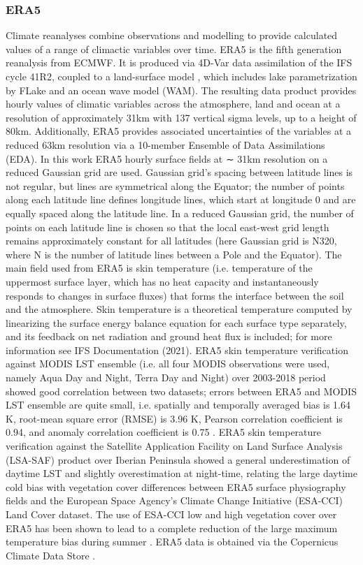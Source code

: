 \documentclass[hess, twostagejnl]{copernicus}
\begin{document}
\subsubsection{ERA5}
\noindent Climate reanalyses combine observations and modelling to provide calculated values of a range of climactic variables over time. ERA5 is the fifth generation reanalysis from ECMWF. It is produced via 4D-Var data assimilation of the IFS cycle 41R2, coupled to a land-surface model \citep[ECLand,][]{Boussetta2021}, which includes lake parametrization by FLake \citep{Mironov2008} and an ocean wave model (WAM). The resulting data product provides hourly values of climatic variables across the atmosphere, land and ocean at a resolution of approximately 31km with 137 vertical sigma levels, up to a height of 80km. Additionally, ERA5 provides associated uncertainties of the variables at a reduced 63km resolution via a 10-member Ensemble of Data Assimilations (EDA). In this work ERA5 hourly surface fields at ∼ 31km resolution on a reduced Gaussian grid are used. Gaussian grid’s spacing between latitude lines is not regular, but lines are symmetrical along the Equator; the number of points along each latitude line defines longitude lines, which start at longitude 0 and are equally spaced along the latitude line. In a reduced Gaussian grid, the number of points on each latitude line is chosen so that the local east-west grid length remains approximately constant for all latitudes (here Gaussian grid is N320, where N is the number of latitude lines between a Pole and the Equator). The main field used from ERA5 is skin temperature (i.e. temperature of the uppermost surface layer, which has no heat capacity and instantaneously responds to changes in surface fluxes) that forms the interface between the soil and the atmosphere. Skin temperature is a theoretical temperature computed by linearizing the surface energy balance equation for each surface type separately, and its feedback on net radiation and ground heat flux is included; for more information see IFS Documentation (2021). ERA5 skin temperature verification against MODIS LST ensemble (i.e. all four MODIS observations were used, namely Aqua Day and Night, Terra Day and Night) over 2003-2018 period showed good correlation between two datasets; errors between ERA5 and MODIS LST ensemble are quite small, i.e. spatially and temporally averaged bias is 1.64 K, root-mean square error (RMSE) is 3.96 K, Pearson correlation coefficient is 0.94, and anomaly correlation coefficient is 0.75 \citep{essd-13-4349-2021}. ERA5 skin temperature verification against the Satellite Application Facility on Land Surface Analysis (LSA-SAF) product over Iberian Peninsula showed a general underestimation of daytime LST and slightly overestimation at night-time, relating the large daytime cold bias with vegetation cover differences between ERA5 surface physiography fields and the European Space Agency’s Climate Change Initiative (ESA-CCI) Land Cover dataset. The use of ESA-CCI low and high vegetation cover over ERA5 has been shown to lead to a complete reduction of the large maximum temperature bias during summer \citep{Johannsen2019}. ERA5 data is obtained via the Copernicus Climate Data Store \citep[CDS;][]{CDS}.
\end{document}
